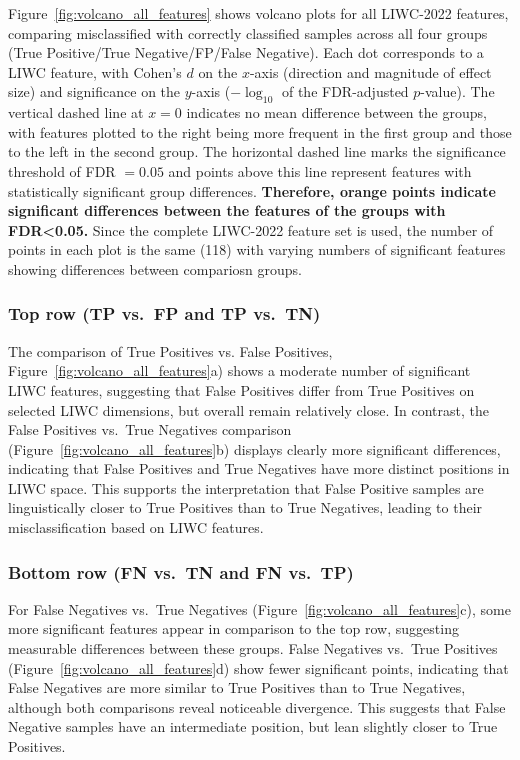 Figure~\ref{fig:volcano_all_features} shows volcano plots for all LIWC-2022 features, comparing misclassified with correctly classified samples across all four groups (True Positive/True Negative/FP/False Negative). 
Each dot corresponds to a LIWC feature, with Cohen’s $d$ \cite{cohen1988} on the $x$-axis (direction and magnitude of effect size) and significance on the $y$-axis ($-\log_{10}$ of the FDR-adjusted $p$-value). The vertical dashed line at $x=0$ indicates no mean difference between the groups, with features plotted to the right being more frequent in the first group and those to the left in the second group. 
The horizontal dashed line marks the significance threshold of FDR $=0.05$ and points above this line represent features with statistically significant group differences. \textbf{Therefore, orange points indicate significant differences between the features of the groups with FDR<0.05.} Since the complete LIWC-2022 feature set is used, the number of points in each plot is the same (118) with varying numbers of significant features showing differences between compariosn groups.

\subsubsection{Top row (TP vs.\ FP and TP vs.\ TN)}
The comparison of True Positives vs. False Positives, Figure~\ref{fig:volcano_all_features}a) shows a moderate number of significant LIWC features,  suggesting that False Positives differ from True Positives on selected LIWC dimensions, but overall remain relatively close. 
In contrast, the False Positives vs.\ True Negatives comparison (Figure~\ref{fig:volcano_all_features}b) displays clearly more significant differences, indicating that False Positives and True Negatives have more distinct positions in LIWC space. 
This supports the interpretation that False Positive samples are linguistically closer to True Positives than to True Negatives, leading to their misclassification based on LIWC features.

\subsubsection{Bottom row (FN vs.\ TN and FN vs.\ TP)}
For False Negatives vs.\ True Negatives (Figure~\ref{fig:volcano_all_features}c), some more significant features appear in comparison to the top row, suggesting measurable differences between these groups. 
False Negatives vs.\ True Positives (Figure~\ref{fig:volcano_all_features}d) show fewer significant points, indicating that False Negatives are more similar to True Positives than to True Negatives, although both comparisons reveal noticeable divergence. This suggests that False Negative samples have an intermediate position, but lean slightly closer to True Positives.

